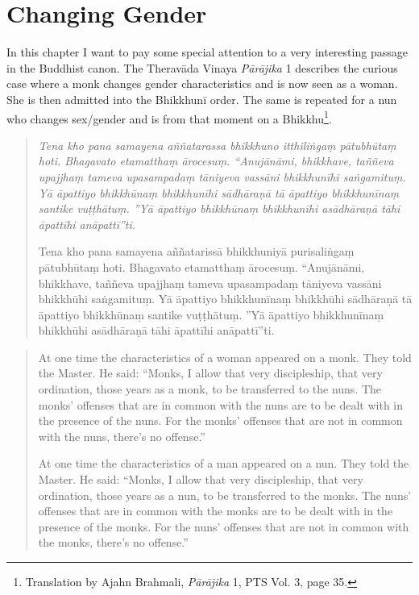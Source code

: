 \section{Changing Gender}

In this chapter I want to pay some special attention to a very interesting passage in the Buddhist canon. The Theravāda Vinaya {\em Pā­rāji­ka} 1 describes the curious case where a monk changes gender characteristics and is now seen as a woman. She is then admitted into the Bhikkhunī order. The same is repeated for a nun who changes sex/gender and is from that moment on a Bhikkhu\footnote{Translation by Ajahn Brahmali, {\em Pā­rāji­ka} 1, PTS Vol. 3, page 35.}. 

\begin{quote}
{\em Tena kho pana samayena aññatarassa bhikkhuno itthiliṅgaṃ pātubhūtaṃ hoti. Bhagavato etamatthaṃ ārocesuṃ. “Anujānāmi, bhikkhave, taññeva upajjhaṃ tameva upasampadaṃ tāniyeva vassāni bhikkhunīhi saṅgamituṃ. Yā āpattiyo bhikkhūnaṃ bhikkhunīhi sādhāraṇā tā āpattiyo bhikkhunīnaṃ santike vuṭṭhātuṃ. ”Yā āpattiyo bhikkhūnaṃ bhikkhunīhi asādhāraṇā tāhi āpattīhi anāpattī”ti.

Tena kho pana samayena aññatarissā bhikkhuniyā purisaliṅgaṃ pātubhūtaṃ hoti. Bhagavato etamatthaṃ ārocesuṃ. “Anujānāmi, bhikkhave, taññeva upajjhaṃ tameva upasampadaṃ tāniyeva vassāni bhikkhūhi saṅgamituṃ. Yā āpattiyo bhikkhunīnaṃ bhikkhūhi sādhāraṇā tā āpattiyo bhikkhūnaṃ santike vuṭṭhātuṃ. ”Yā āpattiyo bhikkhunīnaṃ bhikkhūhi asādhāraṇā tāhi āpattīhi anāpattī”ti.}
\end{quote}

\begin{quote}
At one time the characteristics of a woman appeared on a monk. They told the Master. He said: “Monks, I allow that very discipleship, that very ordination, those years as a monk, to be transferred to the nuns. The monks’ offenses that are in common with the nuns are to be dealt with in the presence of the nuns. For the monks’ offenses that are not in common with the nuns, there’s no offense.”

At one time the characteristics of a man appeared on a nun. They told the Master. He said: “Monks, I allow that very discipleship, that very ordination, those years as a nun, to be transferred to the monks. The nuns’ offenses that are in common with the monks are to be dealt with in the presence of the monks. For the nuns’ offenses that are not in common with the monks, there’s no offense.”
\end{quote}

